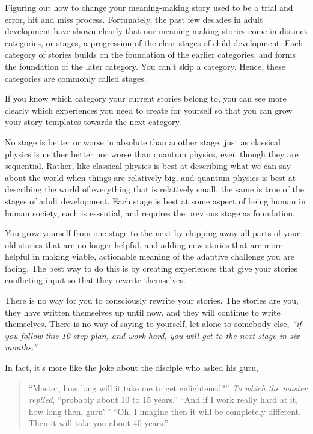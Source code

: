 Figuring out how to change your meaning-making story used to be a trial and error, hit and miss process. Fortunately, the past few decades in adult development have shown clearly\cite{constantin-are-developmental-stages-real} that our meaning-making stories come in distinct categories, or stages, a progression of the clear stages of child development. Each category of stories builds on the foundation of the earlier categories, and forms the foundation of the later category. You can't skip a category. Hence, these categories are commonly called stages. 


If you know which category your current stories belong to, you can see more clearly which experiences you need to create for yourself so that you can grow your story templates towards the next category.


No stage is better or worse in absolute than another stage, just as classical physics is neither better nor worse than quantum physics, even though they are sequential. Rather, like classical physics is best at describing what we can say about the world when things are relatively big, and quantum physics is best at describing the world of everything that is relatively small, the same is true of the stages of adult development. Each stage is best at some aspect of being human in human society, each is essential, and requires the previous stage as foundation. 


You grow yourself from one stage to the next by chipping away all parts of your old stories that are no longer helpful, and adding new stories that are more helpful in making viable, actionable meaning of the adaptive challenge you are facing. The best way to do this is by creating experiences that give your stories conflicting input so that they rewrite themselves.


There is no way for you to consciously rewrite your stories. The stories are you, they have written themselves up until now, and they will continue to write themselves. There is no way of saying to yourself, let alone to somebody else, \emph{“if you follow this 10-step plan, and work hard, you will get to the next stage in six months.”}


In fact, it's more like the joke about the disciple who asked his guru, 
\begin{quote}
 “Master, how long will it take me to get enlightened?”
\emph{To which the master replied}, “probably about 10 to 15 years.”
 “And if I work really hard at it, how long then, guru?”
 “Oh, I imagine then it will be completely different. Then it will take you about 40 years.”
\end{quote}



